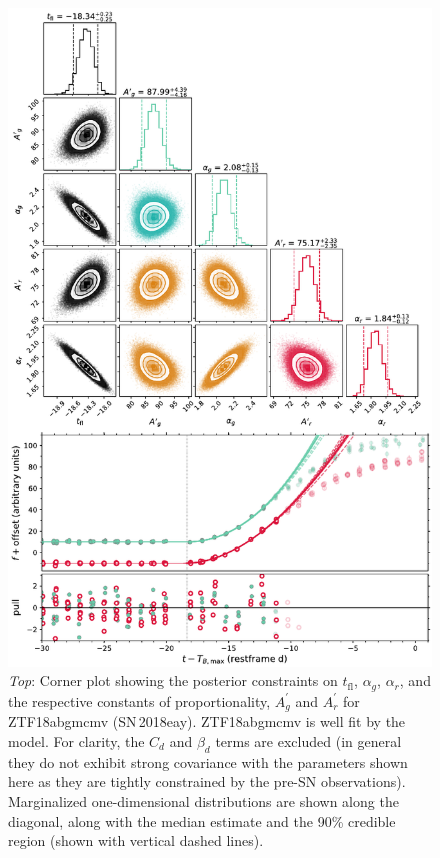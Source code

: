 \documentclass[twocolumn]{./aastex63}
\newcommand{\tfl}{$t_\mathrm{fl}$}
\begin{document}
\begin{figure}
    \centering
    \includegraphics[width=5.2in]{./figures/Fig1.pdf}
    \caption{\textit{Top}: Corner plot showing the posterior constraints on
    \tfl, $\alpha_g$, $\alpha_r$, and the respective constants of
    proportionality, $A_g^\prime$ and $A_r^\prime$ for ZTF18abgmcmv
    (SN\,2018eay). ZTF18abgmcmv is well fit by the model. For clarity, the
    $C_d$ and $\beta_d$ terms are excluded (in general they do not exhibit
    strong covariance with the parameters shown here as they are tightly
    constrained by the pre-SN observations). Marginalized one-dimensional
    distributions are shown along the diagonal, along with the median estimate
    and the 90\% credible region (shown with vertical dashed lines).
}
\end{figure}
\end{document}
